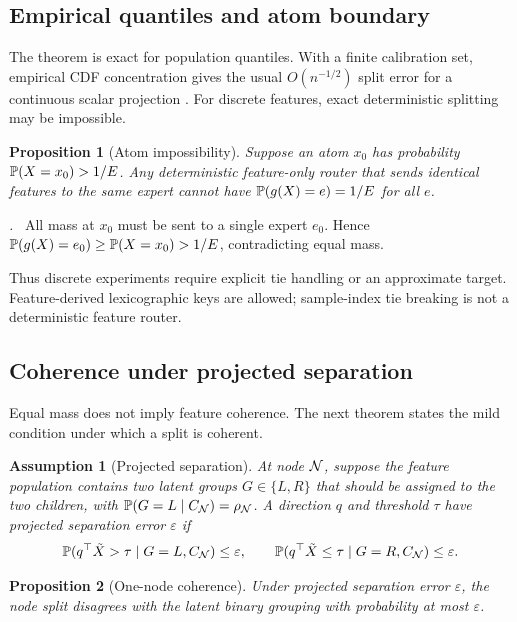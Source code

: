 \documentclass{article}
\newtheorem{assumption}{Assumption}
\newtheorem{proposition}{Proposition}
\renewenvironment{proof}[1][\proofname]{\par\noindent\textit{#1.}\ }{\hfill\qedsymbol\par}
\begin{document}
\subsection{Empirical quantiles and atom boundary}

The theorem is exact for population quantiles.  With a finite calibration set,
empirical CDF concentration gives the usual $O(n^{-1/2})$ split error for a
continuous scalar projection \citep{dvoretzky1956asymptotic}.  For discrete
features, exact deterministic splitting may be impossible.

\begin{proposition}[Atom impossibility]
Suppose an atom $x_0$ has probability $\mathbb{P}(X=x_0)>1/E$.  Any deterministic
feature-only router that sends identical features to the same expert cannot have
$\mathbb{P}(g(X)=e)=1/E$ for all $e$.
\end{proposition}

\begin{proof}
All mass at $x_0$ must be sent to a single expert $e_0$.  Hence
$\mathbb{P}(g(X)=e_0)\ge \mathbb{P}(X=x_0)>1/E$, contradicting equal mass.
\end{proof}

Thus discrete experiments require explicit tie handling or an approximate target.
Feature-derived lexicographic keys are allowed; sample-index tie breaking is not
a deterministic feature router.

\subsection{Coherence under projected separation}

Equal mass does not imply feature coherence.  The next theorem states the mild
condition under which a split is coherent.

\begin{assumption}[Projected separation]
At node $\mathcal{N}$, suppose the feature population contains two latent groups
$G\in\{L,R\}$ that should be assigned to the two children, with
$\mathbb{P}(G=L\mid C_{\mathcal{N}})=\rho_{\mathcal{N}}$.  A direction $q$ and threshold $\tau$
have projected separation error $\varepsilon$ if
\begin{equation}
  \mathbb{P}(q^{\top}\tilde X>\tau\mid G=L,C_{\mathcal{N}})\le \varepsilon,\qquad
  \mathbb{P}(q^{\top}\tilde X\le\tau\mid G=R,C_{\mathcal{N}})\le \varepsilon.
\end{equation}
\end{assumption}

\begin{proposition}[One-node coherence]
Under projected separation error $\varepsilon$, the node split disagrees with the
latent binary grouping with probability at most $\varepsilon$.
\end{proposition}
\end{document}
